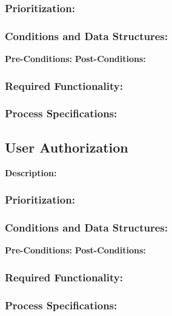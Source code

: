 \subsubsection{Prioritization:}
\subsubsection{Conditions and Data Structures:}
\textbf{Pre-Conditions:}
\textbf{Post-Conditions:}	
\subsubsection{Required Functionality:} 
\subsubsection{Process Specifications:}

\subsection{User Authorization}
\textbf{Description:}
\subsubsection{Prioritization:}
\subsubsection{Conditions and Data Structures:}
\textbf{Pre-Conditions:}
\textbf{Post-Conditions:}	
\subsubsection{Required Functionality:} 
\subsubsection{Process Specifications:}
